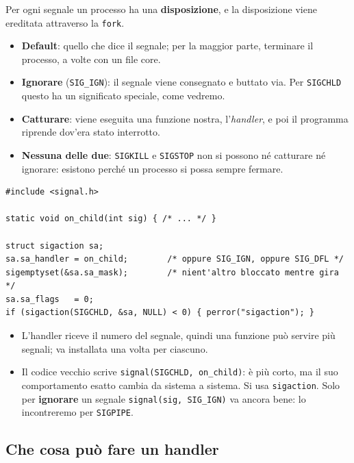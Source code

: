 Per ogni segnale un processo ha una \textbf{disposizione}, e la disposizione viene ereditata attraverso la \texttt{fork}.
\begin{itemize}
    \item \textbf{Default}: quello che dice il segnale; per la maggior parte, terminare il processo, a volte con un file core.
    \item \textbf{Ignorare} (\texttt{SIG\_IGN}): il segnale viene consegnato e buttato via. Per \texttt{SIGCHLD} questo ha un
          significato speciale, come vedremo.
    \item \textbf{Catturare}: viene eseguita una funzione nostra, l'\emph{handler}, e poi il programma riprende dov'era stato
          interrotto.
    \item \textbf{Nessuna delle due}: \texttt{SIGKILL} e \texttt{SIGSTOP} non si possono né catturare né ignorare: esistono
          perché un processo si possa sempre fermare.
\end{itemize}

\begin{lstlisting}[language={[POSIX]C}, style=wnumbers, title={Installare un handler con sigaction}]
#include <signal.h>

static void on_child(int sig) { /* ... */ }

struct sigaction sa;
sa.sa_handler = on_child;        /* oppure SIG_IGN, oppure SIG_DFL */
sigemptyset(&sa.sa_mask);        /* nient'altro bloccato mentre gira */
sa.sa_flags   = 0;
if (sigaction(SIGCHLD, &sa, NULL) < 0) { perror("sigaction"); }
\end{lstlisting}

\begin{itemize}
    \item L'handler riceve il numero del segnale, quindi una funzione può servire più segnali; va installata una volta per
          ciascuno.
    \item Il codice vecchio scrive \texttt{signal(SIGCHLD, on\_child)}: è più corto, ma il suo comportamento esatto cambia da
          sistema a sistema. Si usa \texttt{sigaction}. Solo per \textbf{ignorare} un segnale \texttt{signal(sig, SIG\_IGN)}
          va ancora bene: lo incontreremo per \texttt{SIGPIPE}.
\end{itemize}

\subsection{Che cosa può fare un handler}

